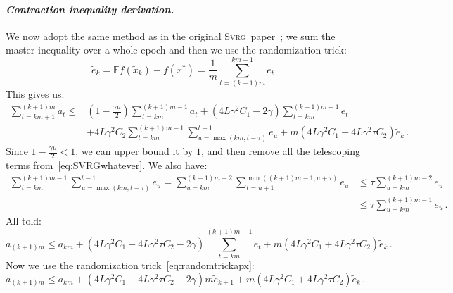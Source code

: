 \documentclass[twoside, 11pt]{article}
\newcommand{\stepsize}{\gamma}
\newcommand{\strongconvex}{\mu}
\newcommand{\overlap}{\tau}
\newcommand{\lipschitz}{L}
\newcommand{\E}{\mathbb{E}}
\newcommand{\SVRG}{\textsc{Svrg}}
\begin{document}
\paragraph{\textit{Contraction inequality derivation.}}\label{apx:SVRGContraction}
We now adopt the same method as in the original \SVRG\ paper~\citep{svrg}; we sum the master inequality over a whole epoch and then we use the randomization trick:
\begin{equation}\label{eq:randomtrickapx}
\tilde e_k = \E f(\tilde x_k) - f(x^*) = \frac{1}{m} \sum_{t=(k-1)m}^{km-1} e_t
\end{equation}
This gives us:
\begin{equation}\label{eq:SVRGwhatever}
\begin{aligned}
\sum_{t=km +1}^{(k+1)m} a_t
\leq
&(1 - \frac{\stepsize\strongconvex}{2})\sum_{t=km}^{(k+1)m-1} a_t
+ (4\lipschitz \stepsize^2 C_1 -2\stepsize) \sum_{t=km}^{(k+1)m-1} e_t
\\
&+ 4\lipschitz \stepsize^2 C_2 \sum_{t=km}^{(k+1)m-1} \sum_{u = \max(km, t-\overlap)}^{t-1} e_u
+ m (4\lipschitz \stepsize^2 C_1 + 4 \lipschitz \stepsize^2\overlap C_2) \tilde e_k \,.
\end{aligned}
\end{equation}
Since $1 - \frac{\stepsize\strongconvex}{2} < 1$, we can upper bound it by $1$, and then remove all the telescoping terms from~\eqref{eq:SVRGwhatever}.
We also have:
\begin{equation}
\begin{aligned}
\sum_{t=km}^{(k+1)m-1} \sum_{u = \max(km, t-\overlap)}^{t-1} e_u =
\sum_{u=km}^{(k+1)m-2} \sum_{t=u+1}^{\min((k+1)m-1, u + \overlap)} e_u &\leq
\overlap \sum_{u=km}^{(k+1)m-2} e_u
\\&\leq
\overlap \sum_{u=km}^{(k+1)m-1} e_u \,.
\end{aligned}
\end{equation}
All told:
\begin{equation}
a_{(k+1)m} \leq
a_{km}
+(4\lipschitz \stepsize^2 C_1 + 4\lipschitz \stepsize^2 \overlap C_2 -2\stepsize) \sum_{t=km}^{(k+1)m-1} e_t
+ m (4\lipschitz \stepsize^2 C_1 + 4 \lipschitz \stepsize^2\overlap C_2) \tilde e_k \,.
\end{equation}
Now we use the randomization trick~\eqref{eq:randomtrickapx}:
\begin{equation}\label{eq:SVRGrand}
a_{(k+1)m} \leq
a_{km}
+(4\lipschitz \stepsize^2 C_1 + 4\lipschitz \stepsize^2 \overlap C_2 -2\stepsize)  m \tilde e_{k+1}
+ m (4\lipschitz \stepsize^2 C_1 + 4 \lipschitz \stepsize^2\overlap C_2) \tilde e_k \,.
\end{equation}
\end{document}
